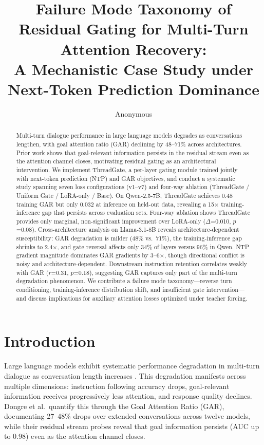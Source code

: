 \documentclass[11pt,a4paper]{article}
\title{Failure Mode Taxonomy of Residual Gating for Multi-Turn Attention Recovery:\\A Mechanistic Case Study under Next-Token Prediction Dominance}
\author{Anonymous}
\date{}
\begin{document}
\maketitle

\begin{abstract}
Multi-turn dialogue performance in large language models degrades as conversations lengthen, with goal attention ratio (GAR) declining by 48--71\% across architectures. Prior work shows that goal-relevant information persists in the residual stream even as the attention channel closes, motivating residual gating as an architectural intervention. We implement ThreadGate, a per-layer gating module trained jointly with next-token prediction (NTP) and GAR objectives, and conduct a systematic study spanning seven loss configurations (v1--v7) and four-way ablation (ThreadGate / Uniform Gate / LoRA-only / Base). On Qwen-2.5-7B, ThreadGate achieves 0.48 training GAR but only 0.032 at inference on held-out data, revealing a 15$\times$ training-inference gap that persists across evaluation sets. Four-way ablation shows ThreadGate provides only marginal, non-significant improvement over LoRA-only ($\Delta$=0.010, $p$=0.08). Cross-architecture analysis on Llama-3.1-8B reveals architecture-dependent susceptibility: GAR degradation is milder (48\% vs.\ 71\%), the training-inference gap shrinks to 2.4$\times$, and gate reversal affects only 34\% of layers versus 96\% in Qwen. NTP gradient magnitude dominates GAR gradients by 3--6$\times$, though directional conflict is noisy and architecture-dependent. Downstream instruction retention correlates weakly with GAR ($r$=0.31, $p$=0.18), suggesting GAR captures only part of the multi-turn degradation phenomenon. We contribute a failure mode taxonomy---reverse turn conditioning, training-inference distribution shift, and insufficient gate intervention---and discuss implications for auxiliary attention losses optimized under teacher forcing.
\end{abstract}

\section{Introduction}

Large language models exhibit systematic performance degradation in multi-turn dialogue as conversation length increases \citep{dongre2026gar}. This degradation manifests across multiple dimensions: instruction following accuracy drops, goal-relevant information receives progressively less attention, and response quality declines. Dongre et al.\ quantify this through the Goal Attention Ratio (GAR), documenting 27--48\% drops over extended conversations across twelve models, while their residual stream probes reveal that goal information persists (AUC up to 0.98) even as the attention channel closes.
\end{document}
